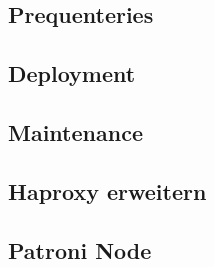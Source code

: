 
\begin{flushleft}
    \subsection{Prequenteries}
    \subsection{Deployment}
    \subsection{Maintenance}
    \subsection{Haproxy erweitern}
    \subsection{Patroni Node}
\end{flushleft}